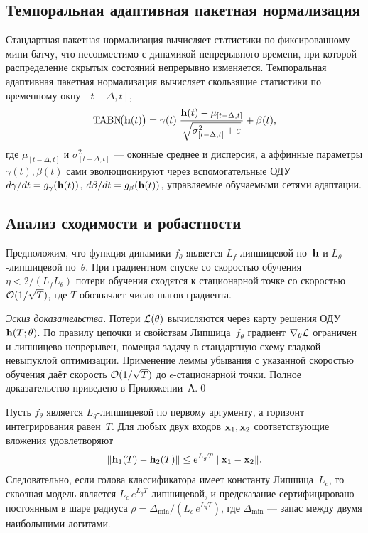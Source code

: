 \subsection{Темпоральная адаптивная пакетная нормализация}

Стандартная пакетная нормализация вычисляет статистики по фиксированному мини-батчу, что несовместимо с динамикой непрерывного времени, при которой распределение скрытых состояний непрерывно изменяется. Темпоральная адаптивная пакетная нормализация вычисляет скользящие статистики по временному окну $[t-\Delta,t]$,
\begin{equation}
\mathrm{TABN}\!\bigl(\mathbf{h}(t)\bigr)
= \gamma(t)\;\frac{\mathbf{h}(t)-\mu_{[t-\Delta,t]}}
  {\sqrt{\sigma^2_{[t-\Delta,t]}+\varepsilon}}
+ \beta(t),
\label{eq:tabn}
\end{equation}
где $\mu_{[t-\Delta,t]}$ и $\sigma^2_{[t-\Delta,t]}$ --- оконные среднее и дисперсия, а аффинные параметры $\gamma(t),\beta(t)$ сами эволюционируют через вспомогательные ОДУ $d\gamma/dt=g_\gamma(\mathbf{h}(t))$, $d\beta/dt=g_\beta(\mathbf{h}(t))$, управляемые обучаемыми сетями адаптации.

\subsection{Анализ сходимости и робастности}

\begin{theorem}
\label{thm:ct_tgnn_conv}
Предположим, что функция динамики $f_\theta$ является $L_f$-липшицевой по~$\mathbf{h}$ и $L_\theta$-липшицевой по~$\theta$. При градиентном спуске со скоростью обучения $\eta<2/(L_f L_\theta)$ потери обучения сходятся к стационарной точке со скоростью $\mathcal{O}(1/\sqrt{T})$, где $T$ обозначает число шагов градиента.
\end{theorem}

\noindent\textit{Эскиз доказательства.} Потери $\mathcal{L}(\theta)$ вычисляются через карту решения ОДУ $\mathbf{h}(T;\theta)$. По правилу цепочки и свойствам Липшица~$f_\theta$ градиент $\nabla_\theta\mathcal{L}$ ограничен и липшицево-непрерывен, помещая задачу в стандартную схему гладкой невыпуклой оптимизации. Применение леммы убывания с указанной скоростью обучения даёт скорость $\mathcal{O}(1/\sqrt{T})$ до $\epsilon$-стационарной точки. Полное доказательство приведено в Приложении~А.\qed

\begin{theorem}
\label{thm:ct_tgnn_rob}
Пусть $f_\theta$ является $L_g$-липшицевой по первому аргументу, а горизонт интегрирования равен~$T$. Для любых двух входов $\mathbf{x}_1,\mathbf{x}_2$ соответствующие вложения удовлетворяют
\begin{equation}
\|\mathbf{h}_1(T)-\mathbf{h}_2(T)\|
\le e^{L_g T}\;\|\mathbf{x}_1-\mathbf{x}_2\|.
\label{eq:lip_cert}
\end{equation}
Следовательно, если голова классификатора имеет константу Липшица~$L_c$, то сквозная модель является $L_c\,e^{L_g T}$-липшицевой, и предсказание сертифицировано постоянным в шаре радиуса $\rho = \Delta_{\min}/(L_c\,e^{L_g T})$, где $\Delta_{\min}$ --- запас между двумя наибольшими логитами.
\end{theorem}

